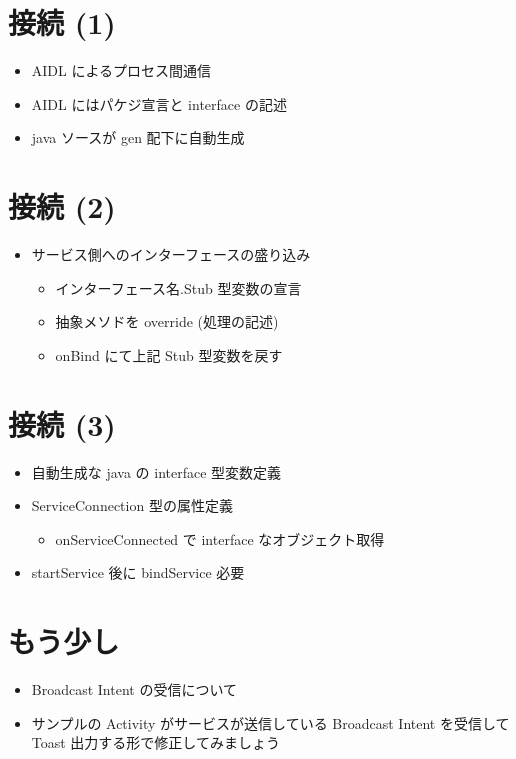 \documentclass[slide,papersize]{jsarticle}
\begin{document}
\section*{接続 (1)}
\bigskip
\begin{itemize}
\item AIDL によるプロセス間通信
\bigskip
\item AIDL にはパケジ宣言と interface の記述
\bigskip
\item java ソースが gen 配下に自動生成
\end{itemize}

\section*{接続 (2)}
\medskip
\begin{itemize}
\item サービス側へのインターフェースの盛り込み
\medskip
 \begin{itemize}
 \item インターフェース名.Stub 型変数の宣言
 \medskip
 \item 抽象メソドを override (処理の記述)
 \medskip
 \item onBind にて上記 Stub 型変数を戻す
 \end{itemize}
\end{itemize}

\section*{接続 (3)}
\smallskip
\begin{itemize}
\item 自動生成な java の interface 型変数定義
\medskip
\item ServiceConnection 型の属性定義
 \begin{itemize}
 \item onServiceConnected で interface なオブジェクト取得
 \end{itemize}
\medskip
\item startService 後に bindService 必要
\end{itemize}


\section*{もう少し}
\bigskip
\begin{itemize}
\item Broadcast Intent の受信について
\bigskip
\item サンプルの Activity がサービスが送信している Broadcast Intent を受信して Toast 出力する形で修正してみましょう
\end{itemize}
\end{document}
